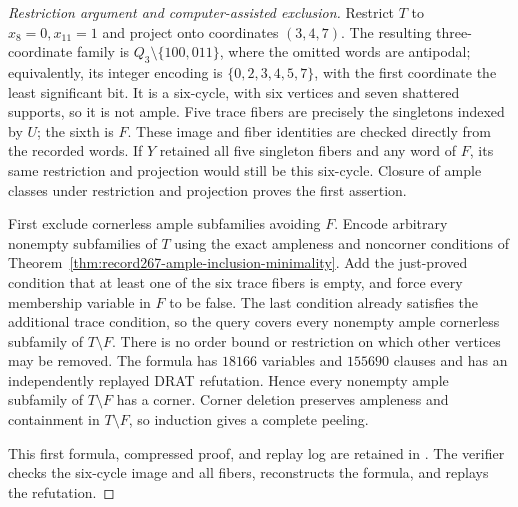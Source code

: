 \documentclass[11pt]{article}
\numberwithin{equation}{section}
\theoremstyle{definition}
\theoremstyle{remark}
\begin{document}
\begin{proof}[Restriction argument and computer-assisted exclusion]
Restrict $T$ to $x_8=0,x_{11}=1$ and project onto coordinates $(3,4,7)$.
The resulting three-coordinate family is $Q_3\setminus\{100,011\}$,
where the omitted words are antipodal; equivalently, its integer encoding
is $\{0,2,3,4,5,7\}$, with the first coordinate the least significant bit.
It is a six-cycle, with six vertices and seven shattered supports, so it
is not ample. Five trace fibers are precisely the singletons indexed by
$U$; the sixth is $F$. These image and fiber identities are checked
directly from the recorded words. If $Y$ retained all five singleton
fibers and any word of $F$, its same restriction and projection would
still be this six-cycle. Closure of ample classes under restriction and
projection proves the first assertion.

First exclude cornerless ample subfamilies avoiding $F$. Encode arbitrary nonempty subfamilies of $T$
using the exact ampleness and noncorner conditions of
Theorem~\ref{thm:record267-ample-inclusion-minimality}. Add the just-proved
condition that at least one of the six trace fibers is empty, and force
every membership variable in $F$ to be false. The last condition already
satisfies the additional trace condition, so the query covers every
nonempty ample cornerless subfamily of $T\setminus F$. There is no order
bound or restriction on which other vertices may be removed. The formula
has $18166$ variables and $155690$ clauses and has an independently
replayed DRAT refutation. Hence every nonempty ample subfamily of
$T\setminus F$ has a corner. Corner deletion preserves ampleness and
containment in $T\setminus F$, so induction gives a complete peeling.

This first formula, compressed proof, and replay log are retained in
.
The verifier  checks the
six-cycle image and all fibers, reconstructs the formula, and replays
the refutation.


\end{proof}
\end{document}

